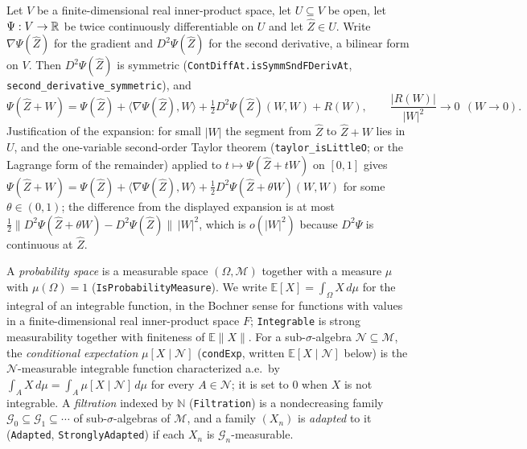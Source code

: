 \begin{proposition}
Let $V$ be a finite-dimensional real inner-product space, let $U\subseteq V$ be
open, let $\Psi:V\to\mathbb{R}$ be twice continuously differentiable on $U$ and let
$\widehat Z\in U$. Write $\nabla\Psi(\widehat Z)$ for the gradient and
$D^2\Psi(\widehat Z)$ for the second derivative, a bilinear form on $V$. Then
$D^2\Psi(\widehat Z)$ is symmetric
(\texttt{ContDiffAt.isSymmSndFDerivAt}, \texttt{second\_derivative\_symmetric}),
and
\[
  \Psi(\widehat Z+W)=\Psi(\widehat Z)+\langle\nabla\Psi(\widehat Z),W\rangle
    +\tfrac12D^2\Psi(\widehat Z)(W,W)+R(W),
  \qquad \frac{|R(W)|}{|W|^2}\longrightarrow0\ \ (W\to0).
\]
Justification of the expansion: for small $|W|$ the segment from $\widehat Z$ to
$\widehat Z+W$ lies in $U$, and the one-variable second-order Taylor theorem
(\texttt{taylor\_isLittleO}; or the Lagrange form of the remainder) applied to
$t\mapsto\Psi(\widehat Z+tW)$ on $[0,1]$ gives
$\Psi(\widehat Z+W)=\Psi(\widehat Z)+\langle\nabla\Psi(\widehat Z),W\rangle
+\tfrac12D^2\Psi(\widehat Z+\theta W)(W,W)$ for some $\theta\in(0,1)$; the
difference from the displayed expansion is at most
$\tfrac12\|D^2\Psi(\widehat Z+\theta W)-D^2\Psi(\widehat Z)\|\,|W|^2$, which is
$o(|W|^2)$ because $D^2\Psi$ is continuous at $\widehat Z$.
\end{proposition}

\begin{definition}
A \emph{probability space} is a measurable space $(\Omega,\mathcal M)$ together
with a measure $\mu$ with $\mu(\Omega)=1$ (\texttt{IsProbabilityMeasure}). We
write $\mathbb E[X]=\int_\Omega X\,d\mu$ for the integral of an integrable
function, in the Bochner sense for functions with values in a
finite-dimensional real inner-product space $F$; \texttt{Integrable} is strong
measurability together with finiteness of $\mathbb E\|X\|$. For a
sub-$\sigma$-algebra $\mathcal N\subseteq\mathcal M$, the \emph{conditional
expectation} $\mu[X\mid\mathcal N]$ (\texttt{condExp}, written
$\mathbb E[X\mid\mathcal N]$ below) is the $\mathcal N$-measurable integrable
function characterized a.e.\ by $\int_AX\,d\mu=\int_A\mu[X\mid\mathcal N]\,d\mu$
for every $A\in\mathcal N$; it is set to $0$ when $X$ is not integrable. A
\emph{filtration} indexed by $\mathbb N$ (\texttt{Filtration}) is a
nondecreasing family $\mathcal G_0\subseteq\mathcal G_1\subseteq\cdots$ of
sub-$\sigma$-algebras of $\mathcal M$, and a family $(X_n)$ is
\emph{adapted} to it (\texttt{Adapted}, \texttt{StronglyAdapted}) if each $X_n$
is $\mathcal G_n$-measurable.
\end{definition}

